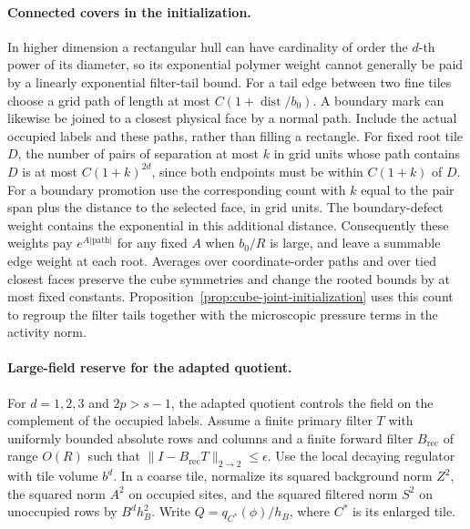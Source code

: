 \documentclass[11pt]{article}
\theoremstyle{definition}
\begin{document}
\paragraph{Connected covers in the initialization.}
In higher dimension a rectangular hull can have cardinality
of order the \(d\)-th power of its diameter, so its exponential
polymer weight cannot generally be paid by a linearly exponential
filter-tail bound. For a tail edge between two fine tiles choose
a grid path of length at most \(C(1+\operatorname{dist}/b_0)\).
A boundary mark can likewise be joined to a closest physical
face by a normal path. Include the actual occupied labels and these
paths, rather than filling a rectangle. For fixed root tile \(D\),
the number of pairs of separation at most \(k\) in grid units
whose path contains \(D\) is at most \(C(1+k)^{2d}\), since
both endpoints must be within \(C(1+k)\) of \(D\).
For a boundary promotion use the corresponding count with \(k\)
equal to the pair span plus the distance to the selected face,
in grid units. The boundary-defect weight contains the
exponential in this additional distance. Consequently these
weights pay \(e^{A|\mathrm{path}|}\) for any fixed \(A\) when
\(b_0/R\) is large, and leave a summable edge weight at each root.
Averages over
coordinate-order paths and over tied closest faces preserve the cube
symmetries and change the rooted bounds by at most fixed constants.
Proposition~\ref{prop:cube-joint-initialization} uses this count to
regroup the filter tails together with the microscopic pressure
terms in the activity norm.

\paragraph{Large-field reserve for the adapted quotient.}
For \(d=1,2,3\) and \(2p>s-1\), the adapted quotient controls
the field on the complement of the occupied labels. Assume a finite primary filter \(T\) with uniformly
bounded absolute rows and columns and a finite forward filter
\(B_{\mathrm{rec}}\) of range \(O(R)\) such that
\(\|I-B_{\mathrm{rec}}T\|_{2\to2}\le\epsilon\). Use the local decaying regulator with tile volume \(b^d\).
In a coarse tile, normalize its squared background norm \(Z^2\),
the squared norm \(A^2\) on occupied sites, and the squared
filtered norm \(S^2\) on unoccupied rows by \(B^d h_B^2\).
Write \(Q=q_{C^*}(\phi)/h_B\), where \(C^*\) is its enlarged tile.
\end{document}
